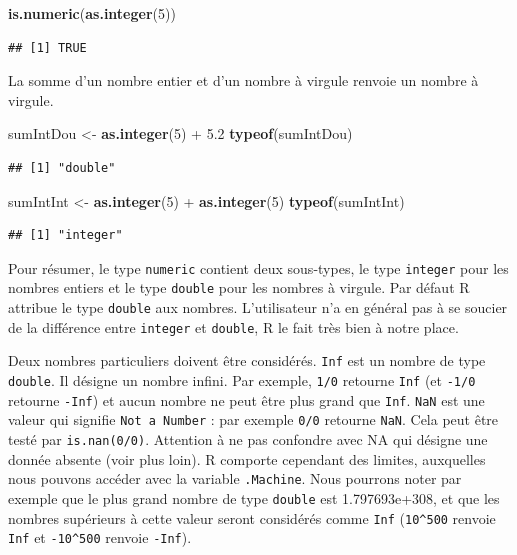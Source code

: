 \documentclass[twoside,symmetric]{book}
\newenvironment{Shaded}{}{}
\newcommand{\DecValTok}[1]{#1}
\newcommand{\FloatTok}[1]{#1}
\newcommand{\KeywordTok}[1]{\textbf{#1}}
\newcommand{\NormalTok}[1]{#1}
\newcommand{\OperatorTok}[1]{#1}
\newcommand{\StringTok}[1]{#1}
\begin{document}
\begin{Shaded}
\begin{Highlighting}[]
\KeywordTok{is.numeric}\NormalTok{(}\KeywordTok{as.integer}\NormalTok{(}\DecValTok{5}\NormalTok{))}
\end{Highlighting}
\end{Shaded}

\begin{verbatim}
## [1] TRUE
\end{verbatim}

La somme d'un nombre entier et d'un nombre à virgule renvoie un nombre à virgule.

\begin{Shaded}
\begin{Highlighting}[]
\NormalTok{sumIntDou <-}\StringTok{ }\KeywordTok{as.integer}\NormalTok{(}\DecValTok{5}\NormalTok{) }\OperatorTok{+}\StringTok{ }\FloatTok{5.2}
\KeywordTok{typeof}\NormalTok{(sumIntDou)}
\end{Highlighting}
\end{Shaded}

\begin{verbatim}
## [1] "double"
\end{verbatim}

\begin{Shaded}
\begin{Highlighting}[]
\NormalTok{sumIntInt <-}\StringTok{ }\KeywordTok{as.integer}\NormalTok{(}\DecValTok{5}\NormalTok{) }\OperatorTok{+}\StringTok{ }\KeywordTok{as.integer}\NormalTok{(}\DecValTok{5}\NormalTok{)}
\KeywordTok{typeof}\NormalTok{(sumIntInt)}
\end{Highlighting}
\end{Shaded}

\begin{verbatim}
## [1] "integer"
\end{verbatim}

Pour résumer, le type \texttt{numeric} contient deux sous-types, le type \texttt{integer} pour les nombres entiers et le type \texttt{double} pour les nombres à virgule. Par défaut R attribue le type \texttt{double} aux nombres. L'utilisateur n'a en général pas à se soucier de la différence entre \texttt{integer} et \texttt{double}, R le fait très bien à notre place.

Deux nombres particuliers doivent être considérés. \texttt{Inf} est un nombre de type \texttt{double}. Il désigne un nombre infini. Par exemple, \texttt{1/0} retourne \texttt{Inf} (et \texttt{-1/0} retourne \texttt{-Inf}) et aucun nombre ne peut être plus grand que \texttt{Inf}. \texttt{NaN} est une valeur qui signifie \texttt{Not\ a\ Number} : par exemple \texttt{0/0} retourne \texttt{NaN}. Cela peut être testé par \texttt{is.nan(0/0)}. Attention à ne pas confondre avec NA qui désigne une donnée absente (voir plus loin). R comporte cependant des limites, auxquelles nous pouvons accéder avec la variable \texttt{.Machine}. Nous pourrons noter par exemple que le plus grand nombre de type \texttt{double} est 1.797693e+308, et que les nombres supérieurs à cette valeur seront considérés comme \texttt{Inf} (\texttt{10\^{}500} renvoie \texttt{Inf} et \texttt{-10\^{}500} renvoie \texttt{-Inf}).
\end{document}

